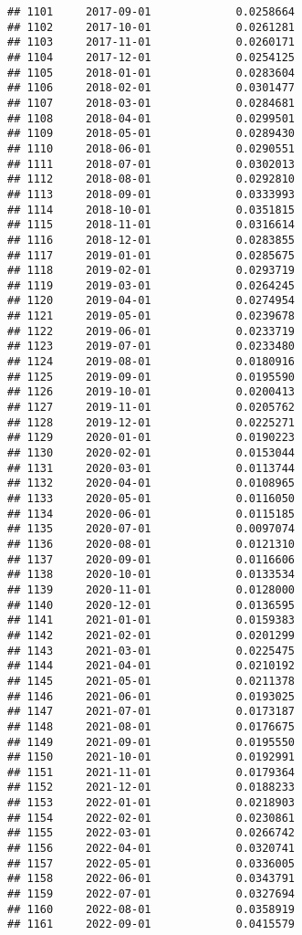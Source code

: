 \documentclass[
]{article}
\begin{document}
\begin{verbatim}
## 1101     2017-09-01             0.0258664
## 1102     2017-10-01             0.0261281
## 1103     2017-11-01             0.0260171
## 1104     2017-12-01             0.0254125
## 1105     2018-01-01             0.0283604
## 1106     2018-02-01             0.0301477
## 1107     2018-03-01             0.0284681
## 1108     2018-04-01             0.0299501
## 1109     2018-05-01             0.0289430
## 1110     2018-06-01             0.0290551
## 1111     2018-07-01             0.0302013
## 1112     2018-08-01             0.0292810
## 1113     2018-09-01             0.0333993
## 1114     2018-10-01             0.0351815
## 1115     2018-11-01             0.0316614
## 1116     2018-12-01             0.0283855
## 1117     2019-01-01             0.0285675
## 1118     2019-02-01             0.0293719
## 1119     2019-03-01             0.0264245
## 1120     2019-04-01             0.0274954
## 1121     2019-05-01             0.0239678
## 1122     2019-06-01             0.0233719
## 1123     2019-07-01             0.0233480
## 1124     2019-08-01             0.0180916
## 1125     2019-09-01             0.0195590
## 1126     2019-10-01             0.0200413
## 1127     2019-11-01             0.0205762
## 1128     2019-12-01             0.0225271
## 1129     2020-01-01             0.0190223
## 1130     2020-02-01             0.0153044
## 1131     2020-03-01             0.0113744
## 1132     2020-04-01             0.0108965
## 1133     2020-05-01             0.0116050
## 1134     2020-06-01             0.0115185
## 1135     2020-07-01             0.0097074
## 1136     2020-08-01             0.0121310
## 1137     2020-09-01             0.0116606
## 1138     2020-10-01             0.0133534
## 1139     2020-11-01             0.0128000
## 1140     2020-12-01             0.0136595
## 1141     2021-01-01             0.0159383
## 1142     2021-02-01             0.0201299
## 1143     2021-03-01             0.0225475
## 1144     2021-04-01             0.0210192
## 1145     2021-05-01             0.0211378
## 1146     2021-06-01             0.0193025
## 1147     2021-07-01             0.0173187
## 1148     2021-08-01             0.0176675
## 1149     2021-09-01             0.0195550
## 1150     2021-10-01             0.0192991
## 1151     2021-11-01             0.0179364
## 1152     2021-12-01             0.0188233
## 1153     2022-01-01             0.0218903
## 1154     2022-02-01             0.0230861
## 1155     2022-03-01             0.0266742
## 1156     2022-04-01             0.0320741
## 1157     2022-05-01             0.0336005
## 1158     2022-06-01             0.0343791
## 1159     2022-07-01             0.0327694
## 1160     2022-08-01             0.0358919
## 1161     2022-09-01             0.0415579
\end{verbatim}
\end{document}
